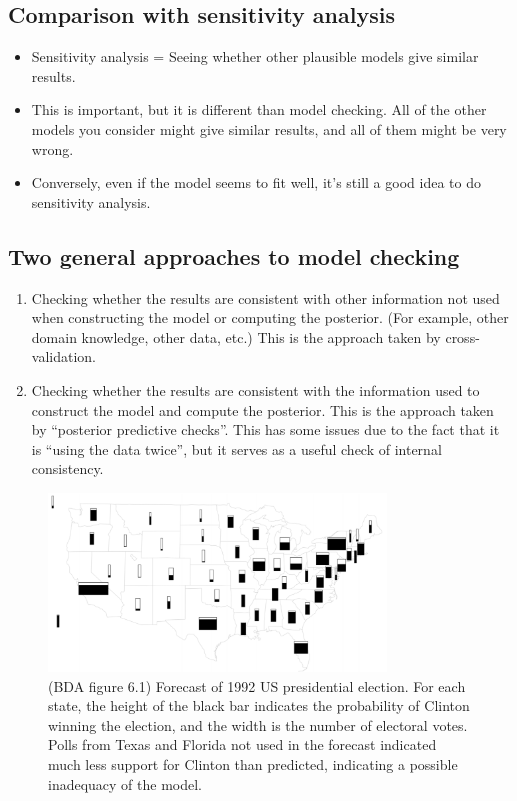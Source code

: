 \documentclass[12pt]{article}
\begin{document}
\subsection*{Comparison with sensitivity analysis}
\begin{itemize}
\item Sensitivity analysis = Seeing whether other plausible models give similar results.
\item This is important, but it is different than model checking. All of the other models you consider might give similar results, and all of them might be very wrong.
\item Conversely, even if the model seems to fit well, it's still a good idea to do sensitivity analysis.
\end{itemize}

\subsection*{Two general approaches to model checking}
\begin{enumerate}
\item Checking whether the results are consistent with other information not used when constructing the model or computing the posterior. (For example, other domain knowledge, other data, etc.) This is the approach taken by cross-validation.
\item Checking whether the results are consistent with the information used to construct the model and compute the posterior. This is the approach taken by ``posterior predictive checks''. This has some issues due to the fact that it is ``using the data twice'', but it serves as a useful check of internal consistency.
\end{enumerate}


\begin{figure}
\begin{center}
\includegraphics[width=0.8\textwidth]{election.png}
\end{center}
\caption{(BDA figure 6.1) Forecast of 1992 US presidential election. For each state, the height of the black bar indicates the probability of Clinton winning the election, and the width is the number of electoral votes. Polls from Texas and Florida not used in the forecast indicated much less support for Clinton than predicted, indicating a possible inadequacy of the model.}
\end{figure}
\end{document}
